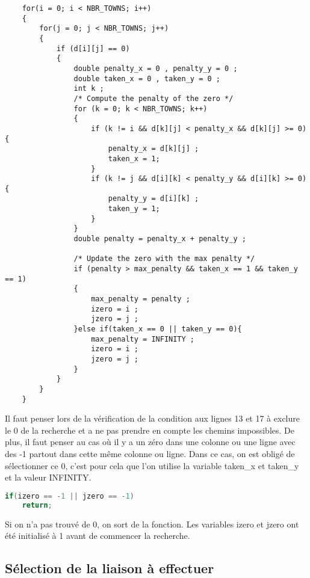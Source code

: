 \documentclass[11pt]{article}
\begin{document}
\begin{lstlisting}
    for(i = 0; i < NBR_TOWNS; i++)
    {
        for(j = 0; j < NBR_TOWNS; j++)
        {
            if (d[i][j] == 0)
            {
                double penalty_x = 0 , penalty_y = 0 ;
                double taken_x = 0 , taken_y = 0 ;
                int k ;
                /* Compute the penalty of the zero */
                for (k = 0; k < NBR_TOWNS; k++)
                {
                    if (k != i && d[k][j] < penalty_x && d[k][j] >= 0){
                        penalty_x = d[k][j] ;
                        taken_x = 1;
                    }
                    if (k != j && d[i][k] < penalty_y && d[i][k] >= 0){
                        penalty_y = d[i][k] ;
                        taken_y = 1;
                    }
                }
                double penalty = penalty_x + penalty_y ;
                
                /* Update the zero with the max penalty */
                if (penalty > max_penalty && taken_x == 1 && taken_y == 1)
                {
                    max_penalty = penalty ;
                    izero = i ;
                    jzero = j ;
                }else if(taken_x == 0 || taken_y == 0){
                    max_penalty = INFINITY ;
                    izero = i ;
                    jzero = j ;
                }
            }
        }
    }
\end{lstlisting}

Il faut penser lors de la vérification de la condition aux lignes 13 et 17 à exclure le 0 de la recherche et a ne pas prendre en compte les chemins impossibles.
De plus, il faut penser au cas où il y a un zéro dans une colonne ou une ligne avec des -1 partout dans cette même colonne ou ligne. Dans ce cas, on est obligé de sélectionner ce 0, c'est pour cela que l'on utilise la variable taken\_x et taken\_y et la valeur INFINITY.

\begin{lstlisting}[language=C]
    if(izero == -1 || jzero == -1)
    return;
\end{lstlisting}

Si on n'a pas trouvé de 0, on sort de la fonction. Les variables izero et jzero ont été initialisé à 1 avant de commencer la recherche.

\subsection{Sélection de la liaison à effectuer}
\end{document}
